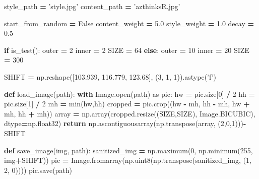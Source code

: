 \documentclass[]{book}
\newenvironment{Shaded}{\begin{snugshade}}{\end{snugshade}}
\newcommand{\KeywordTok}[1]{\textcolor[rgb]{0.13,0.29,0.53}{\textbf{#1}}}
\newcommand{\DecValTok}[1]{\textcolor[rgb]{0.00,0.00,0.81}{#1}}
\newcommand{\FloatTok}[1]{\textcolor[rgb]{0.00,0.00,0.81}{#1}}
\newcommand{\StringTok}[1]{\textcolor[rgb]{0.31,0.60,0.02}{#1}}
\newcommand{\ImportTok}[1]{#1}
\newcommand{\VariableTok}[1]{\textcolor[rgb]{0.00,0.00,0.00}{#1}}
\newcommand{\ControlFlowTok}[1]{\textcolor[rgb]{0.13,0.29,0.53}{\textbf{#1}}}
\newcommand{\OperatorTok}[1]{\textcolor[rgb]{0.81,0.36,0.00}{\textbf{#1}}}
\newcommand{\BuiltInTok}[1]{#1}
\newcommand{\NormalTok}[1]{#1}
\theoremstyle{definition}
\theoremstyle{definition}
\theoremstyle{definition}
\theoremstyle{remark}
\begin{document}
\begin{Shaded}
\begin{Highlighting}[]
\NormalTok{style_path }\OperatorTok{=} \StringTok{'style.jpg'}
\NormalTok{content_path }\OperatorTok{=} \StringTok{'azthinksR.jpg'}

\NormalTok{start_from_random }\OperatorTok{=} \VariableTok{False}
\NormalTok{content_weight }\OperatorTok{=} \FloatTok{5.0}
\NormalTok{style_weight }\OperatorTok{=} \FloatTok{1.0}
\NormalTok{decay }\OperatorTok{=} \FloatTok{0.5}

\ControlFlowTok{if}\NormalTok{ is_test():}
\NormalTok{    outer }\OperatorTok{=} \DecValTok{2}
\NormalTok{    inner }\OperatorTok{=} \DecValTok{2}
\NormalTok{    SIZE }\OperatorTok{=} \DecValTok{64}
\ControlFlowTok{else}\NormalTok{:}
\NormalTok{    outer }\OperatorTok{=} \DecValTok{10}
\NormalTok{    inner }\OperatorTok{=} \DecValTok{20}
\NormalTok{    SIZE }\OperatorTok{=} \DecValTok{300}

\NormalTok{SHIFT }\OperatorTok{=}\NormalTok{ np.reshape([}\FloatTok{103.939}\NormalTok{, }\FloatTok{116.779}\NormalTok{, }\FloatTok{123.68}\NormalTok{], (}\DecValTok{3}\NormalTok{, }\DecValTok{1}\NormalTok{, }\DecValTok{1}\NormalTok{)).astype(}\StringTok{'f'}\NormalTok{)}

\KeywordTok{def}\NormalTok{ load_image(path):}
    \ControlFlowTok{with}\NormalTok{ Image.}\BuiltInTok{open}\NormalTok{(path) }\ImportTok{as}\NormalTok{ pic:}
\NormalTok{        hw }\OperatorTok{=}\NormalTok{ pic.size[}\DecValTok{0}\NormalTok{] }\OperatorTok{/} \DecValTok{2}
\NormalTok{        hh }\OperatorTok{=}\NormalTok{ pic.size[}\DecValTok{1}\NormalTok{] }\OperatorTok{/} \DecValTok{2}
\NormalTok{        mh }\OperatorTok{=} \BuiltInTok{min}\NormalTok{(hw,hh)}
\NormalTok{        cropped }\OperatorTok{=}\NormalTok{ pic.crop((hw }\OperatorTok{-}\NormalTok{ mh, hh }\OperatorTok{-}\NormalTok{ mh, hw }\OperatorTok{+}\NormalTok{ mh, hh }\OperatorTok{+}\NormalTok{ mh))}
\NormalTok{        array }\OperatorTok{=}\NormalTok{ np.array(cropped.resize((SIZE,SIZE), Image.BICUBIC), dtype}\OperatorTok{=}\NormalTok{np.float32)}
        \ControlFlowTok{return}\NormalTok{ np.ascontiguousarray(np.transpose(array, (}\DecValTok{2}\NormalTok{,}\DecValTok{0}\NormalTok{,}\DecValTok{1}\NormalTok{)))}\OperatorTok{-}\NormalTok{SHIFT}

\KeywordTok{def}\NormalTok{ save_image(img, path):}
\NormalTok{    sanitized_img }\OperatorTok{=}\NormalTok{ np.maximum(}\DecValTok{0}\NormalTok{, np.minimum(}\DecValTok{255}\NormalTok{, img}\OperatorTok{+}\NormalTok{SHIFT))}
\NormalTok{    pic }\OperatorTok{=}\NormalTok{ Image.fromarray(np.uint8(np.transpose(sanitized_img, (}\DecValTok{1}\NormalTok{, }\DecValTok{2}\NormalTok{, }\DecValTok{0}\NormalTok{))))}
\NormalTok{    pic.save(path)}


\end{Highlighting}
\end{Shaded}
\end{document}
